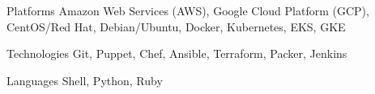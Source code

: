 \begin{cvskills}

\cvskill
    {Platforms}
    {Amazon Web Services (AWS), Google Cloud Platform (GCP), CentOS/Red Hat, Debian/Ubuntu, Docker, Kubernetes, EKS, GKE}

\cvskill
    {Technologies}
    {Git, Puppet, Chef, Ansible, Terraform, Packer, Jenkins}

\cvskill
    {Languages}
    {Shell, Python, Ruby}

\end{cvskills}